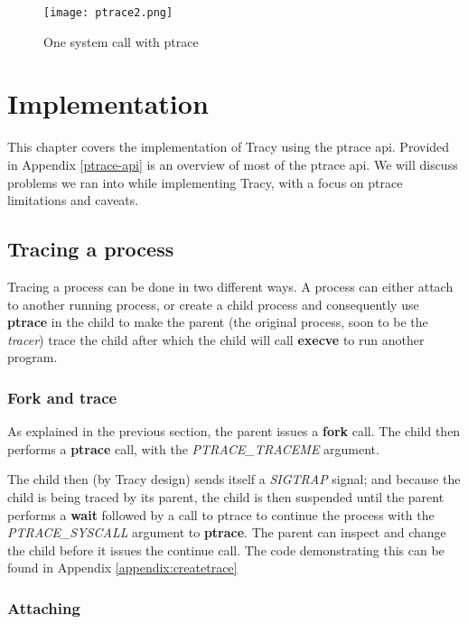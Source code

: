\documentclass[a4paper, 10pt]{report}
\begin{document}
\begin{figure}
\texttt{[image: ptrace2.png]}
\caption{One system call with ptrace}
\label{fig2}
\end{figure}


\chapter{Implementation}

This chapter covers the implementation of Tracy using the ptrace api. Provided
in Appendix \ref{ptrace-api} is an overview of most of the ptrace api.
We will discuss problems we ran into while implementing Tracy, with a focus on
ptrace limitations and caveats.

\section{Tracing a process}

Tracing a process can be done in two different ways. A process can either attach
to another running process, or create a child process and consequently use
\textbf{ptrace} in the child to make the parent (the original process, soon to
be the \textit{tracer}) trace the child after which the child will
call \textbf{execve} to run another program.

\subsection{Fork and trace}

As explained in the previous section, the parent issues a \textbf{fork} call.
The child then performs a \textbf{ptrace} call, with the \textit{PTRACE\_TRACEME} argument.

The child then (by Tracy design)  sends itself a \textit{SIGTRAP} signal;
and because the child is being traced by its parent, the child is then
suspended until the parent performs a \textbf{wait} followed by a call
to ptrace to continue the process with the \textit{PTRACE\_SYSCALL} argument
to \textbf{ptrace}.
The parent can inspect and change the child before it issues
the continue call. The code demonstrating this can be found in
Appendix \ref{appendix:createtrace}

\subsection{Attaching}
\end{document}
